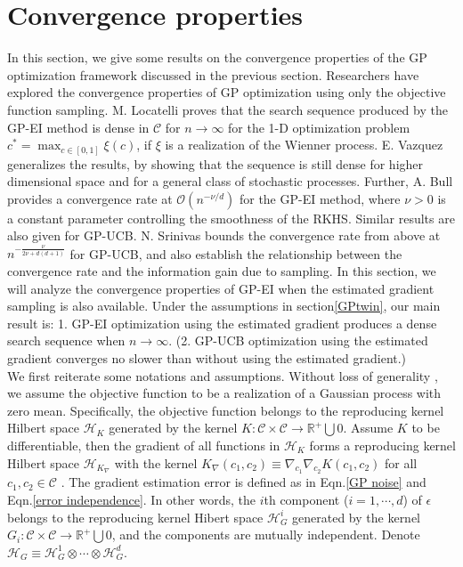 \documentclass[a4paper,onecolumn]{article}
\theoremstyle{remark}
\begin{document}
\section{Convergence properties}
\label{GPconv}
In this section, we give some results on the convergence properties 
of the GP optimization framework discussed in the previous section.
Researchers have explored the convergence properties of GP optimization using only the 
objective function sampling.
M. Locatelli \cite{Locatelli} proves that the search sequence produced by the GP-EI
method is dense in $\mathcal{C}$ for $n\rightarrow \infty$ for the 1-D optimization problem
$c^*=\max_{c\in[0,1]} \xi(c)$, if $\xi$ is a realization of the Wienner process.
E. Vazquez \cite{convergen EI} generalizes the results, by showing that the sequence is still dense
for higher dimensional space and for a general class of stochastic processes.
Further, A. Bull \cite{converge Bull} provides a convergence rate at
$\mathcal{O}(n^{-\nu/d})$ for the GP-EI method,
where $\nu>0$ is a constant parameter controlling the smoothness
of the RKHS. Similar results are also given for GP-UCB. N. Srinivas \cite{GP bandit} bounds the convergence rate
from above at $n^{- \frac{\nu}{2\nu+d(d+1)}}$ for GP-UCB, and also establish the 
relationship between the convergence rate and the information gain due to sampling.
In this section, we will analyze the convergence properties of GP-EI when 
the estimated gradient sampling is also available.
Under the assumptions in section\ref{GPtwin}, our main result is: 1.
GP-EI optimization using the estimated gradient produces a dense search sequence
when $n\rightarrow \infty$. (2. GP-UCB optimization using the estimated gradient
converges no slower than without using the estimated gradient.)\\

We first reiterate some notations and assumptions. 
Without loss of generality \cite{w.o.l.g}
, we assume the objective function to be a realization of a
Gaussian process with zero mean. Specifically, the objective function
belongs to the reproducing kernel Hilbert space $\mathcal{H}_K$ generated by the 
kernel $K: \mathcal{C}\times \mathcal{C} \rightarrow \mathbb{R}^+\bigcup 0$.
Assume $K$ to be differentiable, then the gradient of all functions in $\mathcal{H}_K$
forms a reproducing kernel Hilbert space $\mathcal{H}_{K_\nabla}$ with
the kernel $K_\nabla(c_1,c_2) \equiv \nabla_{c_1}\nabla_{c_2}K(c_1, c_2)$ 
for all $c_1,c_2\in \mathcal{C}$ \cite{derivative RKHS}.
The gradient estimation error is defined as in Eqn.\eqref{GP noise} and 
Eqn.\eqref{error independence}. In other words, the $i$th component ($i=1,\cdots, d$)
of $\epsilon$ belongs to the reproducing kernel Hibert space $\mathcal{H}_{G}^i$ generated by the 
kernel $G_i: \mathcal{C}\times \mathcal{C} \rightarrow \mathbb{R}^+\bigcup 0$, and the components are mutually independent. 
Denote $\mathcal{H}_G \equiv \mathcal{H}_{G}^1 \otimes \cdots \otimes \mathcal{H}_G^d$.\\
\end{document}
